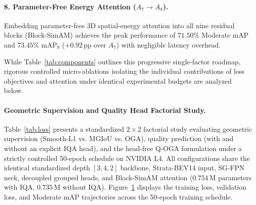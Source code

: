 \paragraph{8. Parameter-Free Energy Attention ($A_7 \to A_8$).}
Embedding parameter-free 3D spatial-energy attention into all nine residual blocks (Block-SimAM) achieves the peak performance of $71.50\%$ Moderate mAP and $73.45\%$ $\text{mAP}_9$ ($+0.92\,\text{pp}$ over $A_7$) with negligible latency overhead.

While Table~\ref{tab:components} outlines this progressive single-factor roadmap, rigorous controlled micro-ablations isolating the individual contributions of loss objectives and attention under identical experimental budgets are analyzed below.


\paragraph{Geometric Supervision and Quality Head Factorial Study.}
Table~\ref{tab:loss} presents a standardized $2\times2$ factorial study evaluating geometric supervision (Smooth-L1 vs. MGIoU vs. OGA), quality prediction (with and without an explicit IQA head), and the head-free Q-OGA formulation under a strictly controlled 50-epoch schedule on NVIDIA L4. All configurations share the identical standardized depth $[3, 4, 2]$ backbone, Strata-BEV14 input, SG-FPN neck, decoupled grouped heads, and Block-SimAM attention ($0.754\,\text{M}$ parameters with IQA, $0.735\,\text{M}$ without IQA). Figure~\ref{fig:loss_ablation_curves} displays the training loss, validation loss, and Moderate mAP trajectories across the 50-epoch training schedule.



\begin{figure}[t]
\centering
{}
\label{fig:loss_ablation_curves}
\end{figure}

